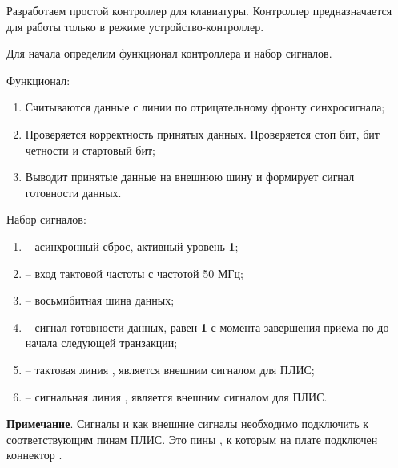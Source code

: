 \vspace{4mm}

\par{Разработаем простой контроллер для клавиатуры. Контроллер предназначается для работы только в режиме устройство-контроллер.}

\par{Для начала определим функционал контроллера и набор сигналов.}

\par{Функционал:}
  \begin{enumerate}%
    \item Считываются данные с линии  по отрицательному фронту синхросигнала;
    \item Проверяется корректность принятых данных. Проверяется стоп бит, бит четности и стартовый бит;
    \item Выводит принятые данные на внешнюю шину и формирует сигнал готовности данных.
  \end{enumerate}

\par{Набор сигналов:}
  \begin{enumerate}%
    \item {} – асинхронный сброс, активный уровень \textbf{1};
    \item {} – вход тактовой частоты с частотой 50 МГц;
    \item {} – восьмибитная шина данных;
    \item {} – сигнал готовности данных, равен \textbf{1} с момента завершения приема по  до начала следующей транзакции;
    \item {} – тактовая линия , является внешним сигналом для ПЛИС;
    \item {} – сигнальная линия , является внешним сигналом для ПЛИС.
  \end{enumerate}

\par{\textbf{Примечание}. Сигналы  и  как внешние сигналы необходимо подключить к соответствующим пинам ПЛИС. Это пины , к которым на плате  подключен коннектор .}

%

